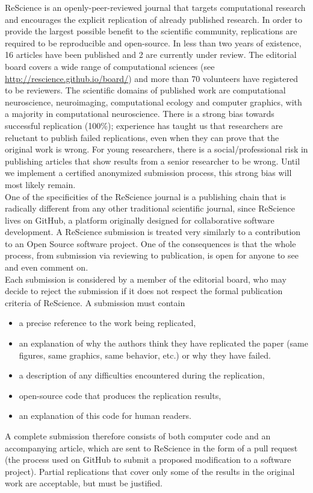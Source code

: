 \documentclass[11pt]{article}
\begin{document}
ReScience is an openly-peer-reviewed journal that targets computational
research and encourages the explicit replication of already published
research. In order to provide the largest possible benefit to the scientific
community, replications are required to be reproducible and open-source. In
less than two years of existence, 16 articles have been published and 2 are
currently under review. The editorial board covers a wide range of
computational sciences (see \url{http://rescience.github.io/board/}) and more
than 70 volunteers have registered to be reviewers. The scientific domains of
published work are computational neuroscience, neuroimaging, computational
ecology and computer graphics, with a majority in computational
neuroscience. There is a strong bias towards successful replication (100\%);
experience has taught us that researchers are reluctant to publish failed
replications, even when they can prove that the original work is wrong. For
young researchers, there is a social/professional risk in publishing articles
that show results from a senior researcher to be wrong. Until we implement a
certified anonymized submission process, this strong bias will most likely
remain.\\

One of the specificities of the ReScience journal is a publishing
chain that is radically different from any other traditional
scientific journal, since ReScience lives on GitHub, a platform
originally designed for collaborative software development. A
ReScience submission is treated very similarly to a contribution to an
Open Source software project. One of the consequences is that the
whole process, from submission via reviewing
to publication, is open for anyone to see and even comment on.\\

Each submission is considered by a member of the editorial board, who
may decide to reject the submission if it does not respect the formal
publication criteria of ReScience. A submission must contain
\begin{itemize}
\item a precise reference to the work being replicated,
\item an explanation of why the authors think they have replicated the paper
  (same figures, same graphics, same behavior, etc.) or why they have failed.
\item a description of any difficulties encountered during the
      replication,
\item open-source code that produces the replication results,
\item an explanation of this code for human readers.
\end{itemize}
A complete submission therefore consists of both computer code and an
accompanying article, which are sent to ReScience in the form of a pull
request (the process used on GitHub to submit a proposed modification
to a software project).
%
Partial replications that cover only some of the results in the
original work are acceptable, but must be justified.\\
\end{document}
